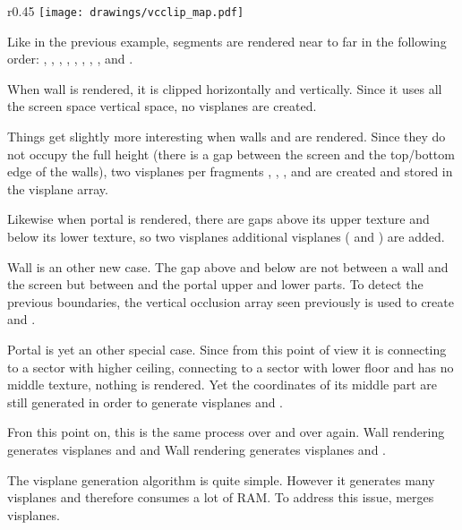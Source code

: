 \begin{wrapfigure}[16]{r}{0.45\textwidth}
\centering
\texttt{[image: drawings/vcclip\_map.pdf]}
\end{wrapfigure}
Like in the previous example, segments are rendered near to far in the following order: , , , , , , , , and .\\
\par
When wall  is rendered, it is clipped horizontally and vertically. Since it uses all the screen space vertical space, no visplanes are created.\\
\par
 Things get slightly more interesting when walls  and  are rendered. Since they do not occupy the full height (there is a gap between the screen and the top/bottom edge of the walls), two visplanes per fragments , , , and  are created and stored in the visplane array.\\
 \par
  Likewise when portal  is rendered, there are gaps above its upper texture and below its lower texture, so two visplanes additional visplanes ( and ) are added.\\
\par
Wall  is an other new case. The gap above and below are not between a wall and the screen but between   and the portal  upper and lower parts. To detect the previous boundaries, the vertical occlusion array seen previously is used to create  and  .\\
\par
Portal  is yet an other special case. Since from this point of view it is connecting to a sector with higher ceiling, connecting to a sector with lower floor and has no middle texture, nothing is rendered. Yet the coordinates of its middle part are still generated in order to generate visplanes  and  .\\
\par
Fron this point on, this is the same process over and over again. Wall  rendering generates visplanes  and   and Wall  rendering generates visplanes  and  .\\
\par
The visplane generation algorithm is quite simple. However it generates many visplanes and therefore consumes a lot of RAM. To address this issue, \doom{}merges visplanes.









